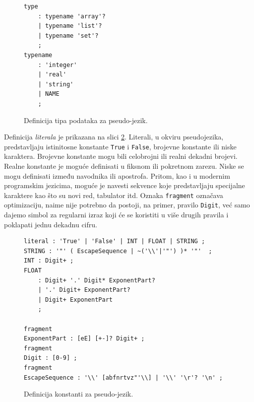 \begin{figure}[h!]
\begin{lstlisting}[language={}]
type 
    : typename 'array'?
    | typename 'list'?
    | typename 'set'?
    ;
typename 
    : 'integer' 
    | 'real' 
    | 'string' 
    | NAME 
    ;
\end{lstlisting}
\caption{Definicija tipa podataka za pseudo-jezik.}
\label{fig:PseudoDef5}
\end{figure}

Definicija \emph{literala} je prikazana na slici \ref{fig:PseudoDef7}. Literali, u okviru pseudojezika, predstavljaju istinitosne konstante \texttt{True} i \texttt{False}, brojevne konstante ili niske karaktera. Brojevne konstante mogu bili celobrojni ili realni dekadni brojevi. Realne konstante je moguće definisati u fiksnom ili pokretnom zarezu. Niske se mogu definisati između navodnika ili apostrofa. Pritom, kao i u modernim programskim jezicima, moguće je navesti sekvence koje predstavljaju specijalne karaktere kao što su novi red, tabulator itd. Oznaka \texttt{fragment} označava optimizaciju, naime nije potrebno da postoji, na primer, pravilo \texttt{Digit}, već samo dajemo simbol za regularni izraz koji će se koristiti u više drugih pravila i poklapati jednu dekadnu cifru.

\begin{figure}[h!]
\begin{lstlisting}[language={}]
literal : 'True' | 'False' | INT | FLOAT | STRING ;
STRING : '"' ( EscapeSequence | ~('\\'|'"') )* '"'  ;
INT : Digit+ ;
FLOAT
    : Digit+ '.' Digit* ExponentPart?
    | '.' Digit+ ExponentPart?
    | Digit+ ExponentPart
    ;

fragment
ExponentPart : [eE] [+-]? Digit+ ;
fragment
Digit : [0-9] ;
fragment
EscapeSequence : '\\' [abfnrtvz"'\\] | '\\' '\r'? '\n' ;
\end{lstlisting}
\caption{Definicija konstanti za pseudo-jezik.}
\label{fig:PseudoDef7}
\end{figure}

